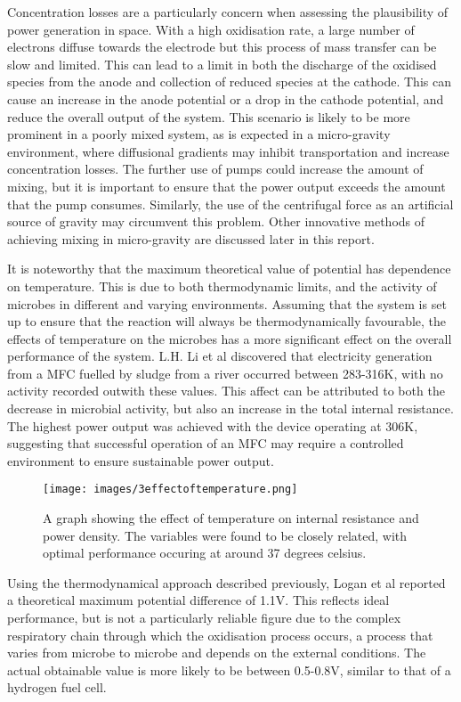 \documentclass[12pt]{article}
\begin{document}
Concentration losses are a particularly concern when assessing the plausibility of power generation in space. With a high oxidisation rate, a large number of electrons diffuse towards the electrode but this process of mass transfer can be slow and limited. This can lead to a limit in both the discharge of the oxidised species from the anode and collection of reduced species at the cathode. This can cause an increase in the anode potential or a drop in the cathode potential, and reduce the overall output of the system. This scenario is likely to be more prominent in a poorly mixed system, as is expected in a micro-gravity environment, where diffusional gradients may inhibit transportation and increase concentration losses. The further use of pumps could increase the amount of mixing, but it is important to ensure that the power output exceeds the amount that the pump consumes. Similarly, the use of the centrifugal force as an artificial source of gravity may circumvent this problem. Other innovative methods of achieving mixing in micro-gravity are discussed later in this report. 

It is noteworthy that the maximum theoretical value of potential has dependence on temperature. This is due to both thermodynamic limits, and the activity of microbes in different and varying environments. Assuming that the system is set up to ensure that the reaction will always be thermodynamically favourable, the effects of temperature on the microbes has a more significant effect on the overall performance of the system. L.H. Li et al \cite{li2013effect} discovered that electricity generation from a MFC fuelled by sludge from a river occurred between 283-316K, with no activity recorded outwith these values. This affect can be attributed to both the decrease in microbial activity, but also an increase in the total internal resistance. The highest power output was achieved with the device operating at 306K, suggesting that successful operation of an MFC may require a controlled environment to ensure sustainable power output.

\begin{figure}[ht]
\centering
\texttt{[image: images/3effectoftemperature.png]}
\caption[\cite{li2013effect}]{A graph showing the effect of temperature on internal resistance and power density. The variables were found to be closely related, with optimal performance occuring at around 37 degrees celsius.}
\label{fig:3effectoftemperature}
\end{figure}

Using the thermodynamical approach described previously, Logan et al \cite{logan2006microbial} reported a theoretical maximum potential difference of 1.1V. This reflects ideal performance, but is not a particularly reliable figure due to the complex respiratory chain through which the oxidisation process occurs, a process that varies from microbe to microbe and depends on the external conditions. The actual obtainable value is more likely to be between 0.5-0.8V, similar to that of a hydrogen fuel cell.\cite{du2007state,logan2005simultaneous}
\end{document}
